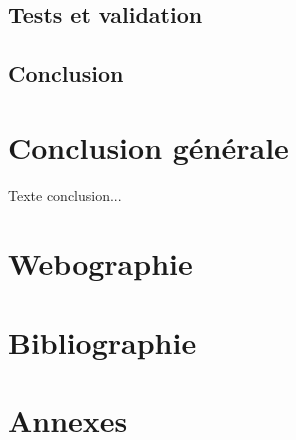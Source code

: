 \documentclass[12pt,a4paper]{report}
\begin{document}
\section{Tests et validation}
\section{Conclusion}


\chapter*{Conclusion générale}

Texte conclusion...


\chapter*{Webographie}


\chapter*{Bibliographie}


\chapter*{Annexes}
\end{document}
